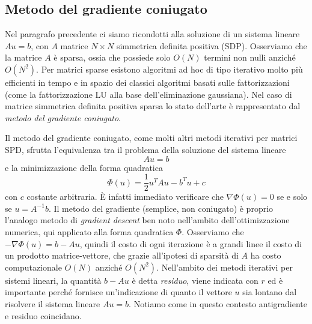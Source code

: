 \documentclass[a4paper,11pt]{article}
\newcommand{\grad}{\nabla}
\begin{document}
\subsection*{Metodo del gradiente coniugato}
Nel paragrafo precedente ci siamo ricondotti alla soluzione
di un sistema lineare $Au = b$, con $A$ matrice $N \times N$
simmetrica definita positiva (SDP). Osserviamo che la matrice $A$
è sparsa, ossia che possiede solo $O(N)$ termini non nulli
anziché $O(N^2)$. Per matrici sparse esistono algoritmi
ad hoc di tipo iterativo molto più efficienti in tempo
e in spazio dei classici algoritmi basati sulle fattorizzazioni
(come la fattorizzazione LU alla base dell'eliminazione gaussiana).
Nel caso di matrice simmetrica definita positiva sparsa
lo stato dell'arte è rappresentato dal \emph{metodo del
gradiente coniugato}.

Il metodo del gradiente coniugato, come molti altri metodi
iterativi per matrici SPD, sfrutta l'equivalenza tra il
problema della soluzione del sistema lineare
\[
Au = b
\]
e la minimizzazione della forma quadratica
\[
\Phi(u) = \frac{1}{2} u^T A u - b^T u + c
\]
con $c$ costante arbitraria. È infatti immediato verificare
che $\grad \Phi(u) = 0$ se e solo se $u = A^{-1}b$.
Il metodo del gradiente (semplice, non coniugato) è proprio
l'analogo metodo di \emph{gradient descent} ben noto
nell'ambito dell'ottimizzazione numerica, qui applicato alla
forma quadratica $\Phi$.
Osserviamo che $-\grad \Phi(u) = b-Au$, quindi il costo di
ogni iterazione è a grandi linee il costo di un prodotto
matrice-vettore, che grazie all'ipotesi di sparsità di $A$
ha costo computazionale $O(N)$ anziché $O(N^2)$.
Nell'ambito dei metodi iterativi per sistemi lineari,
la quantità $b-Au$ è detta \emph{residuo}, viene indicata
con $r$ ed è importante perché fornisce un'indicazione
di quanto il vettore $u$ sia lontano dal risolvere il
sistema lineare $Au = b$. Notiamo come in questo contesto
antigradiente e residuo coincidano.
\end{document}
